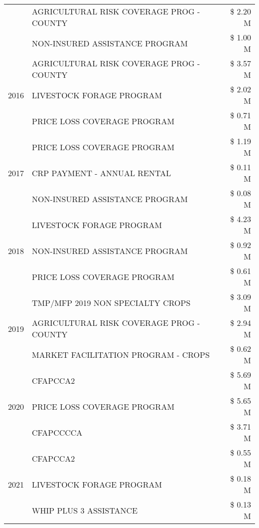 \begin{tabular}{llr}
 & AGRICULTURAL RISK COVERAGE PROG - COUNTY & \$ 2.20 M \\
 & NON-INSURED ASSISTANCE PROGRAM & \$ 1.00 M \\
\cline{1-3}
\multirow[t]{3}{*}{2016} & AGRICULTURAL RISK COVERAGE PROG - COUNTY & \$ 3.57 M \\
 & LIVESTOCK FORAGE PROGRAM & \$ 2.02 M \\
 & PRICE LOSS COVERAGE PROGRAM & \$ 0.71 M \\
\cline{1-3}
\multirow[t]{3}{*}{2017} & PRICE LOSS COVERAGE PROGRAM & \$ 1.19 M \\
 & CRP PAYMENT - ANNUAL RENTAL & \$ 0.11 M \\
 & NON-INSURED ASSISTANCE PROGRAM & \$ 0.08 M \\
\cline{1-3}
\multirow[t]{3}{*}{2018} & LIVESTOCK FORAGE PROGRAM & \$ 4.23 M \\
 & NON-INSURED ASSISTANCE PROGRAM & \$ 0.92 M \\
 & PRICE LOSS COVERAGE PROGRAM & \$ 0.61 M \\
\cline{1-3}
\multirow[t]{3}{*}{2019} & TMP/MFP 2019 NON SPECIALTY CROPS & \$ 3.09 M \\
 & AGRICULTURAL RISK COVERAGE PROG - COUNTY & \$ 2.94 M \\
 & MARKET FACILITATION PROGRAM - CROPS & \$ 0.62 M \\
\cline{1-3}
\multirow[t]{3}{*}{2020} & CFAPCCA2 & \$ 5.69 M \\
 & PRICE LOSS COVERAGE PROGRAM & \$ 5.65 M \\
 & CFAPCCCCA & \$ 3.71 M \\
\cline{1-3}
\multirow[t]{3}{*}{2021} & CFAPCCA2 & \$ 0.55 M \\
 & LIVESTOCK FORAGE PROGRAM & \$ 0.18 M \\
 & WHIP PLUS 3 ASSISTANCE & \$ 0.13 M \\
\cline{1-3}
\bottomrule
\end{tabular}
